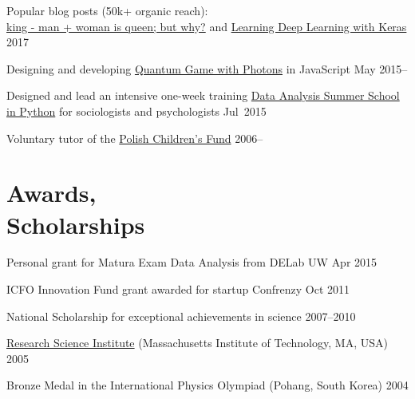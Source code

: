 \documentclass[margin,line]{resume}
\begin{document}
\begin{resume}
    \begin{list2}
      \item Popular blog posts (50k+ organic reach):\\ \href{http://p.migdal.pl/2017/01/06/king-man-woman-queen-why.html}{king - man + woman is queen; but why?} and \href{http://p.migdal.pl/2017/04/30/teaching-deep-learning.html}{Learning Deep Learning with Keras} \hfill {2017}
        \item Designing and developing \href{http://quantumgame.io/}{Quantum Game with Photons} in JavaScript \hfill {May 2015--}
        \item Designed and lead an intensive one-week training \href{http://www.delab.uw.edu.pl/szkola-letnia-dane-2015/}{Data Analysis Summer School in Python} for sociologists and psychologists \hfill { Jul~2015}
        \item Voluntary tutor of the \href{http://crastina.se/gifted-children-in-poland-by-piotr-migdal/}{Polish Children's Fund} \hfill { 2006--}
    \end{list2}


    \section{\mysidestyle Awards,\\Scholarships\\}
    \begin{list2}
        \item Personal grant for Matura Exam Data Analysis from DELab UW \hfill {Apr 2015}
    	\item ICFO Innovation Fund grant awarded for startup Confrenzy \hfill { Oct 2011}
        \item National Scholarship for exceptional achievements in science \hfill {2007--2010}
        \item \href{http://www.cee.org/research-science-institute}{Research Science Institute} (Massachusetts Institute of Technology, MA, USA) \hfill { 2005}
        \item Bronze Medal in the International Physics Olympiad (Pohang, South Korea) \hfill { 2004}
    \end{list2}


\end{resume}
\end{document}
